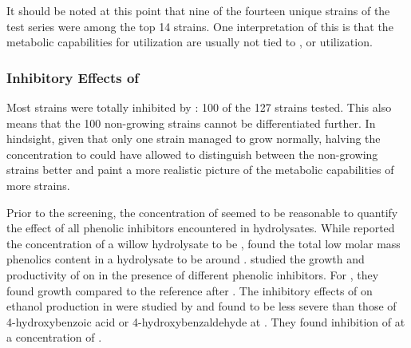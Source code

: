 
It should be noted at this point that nine of the fourteen unique strains of the \laev{} test series were among the \laev{} top 14 strains. One interpretation of this is that the metabolic capabilities for \laev{} utilization are usually not tied to \acet{}, \van{} or \hmf{} utilization.


\subsubsection{Inhibitory Effects of \VAN{}}
Most strains were totally inhibited by \van{}: 100 of the 127 strains tested. This also means that the 100 non-growing strains cannot be differentiated further. In hindsight, given that only one strain managed to grow normally, halving the \van{} concentration to  could have allowed to distinguish between the non-growing strains better and paint a more realistic picture of the metabolic capabilities of more strains.

Prior to the screening, the \van{} concentration of  seemed to be reasonable to quantify the effect of all phenolic inhibitors encountered in hydrolysates. While \textcite{Jonsson1998} reported the \van{} concentration of a willow hydrolysate to be , \textcite{Clark1984} found the total low molar mass phenolics content in a  hydrolysate to be around . \textcite{Nishikawa1988} studied the growth and productivity of  on \xyl{} in the presence of different phenolic inhibitors. For \van{}, they found  growth compared to the reference after . The inhibitory effects of \van{} on ethanol production in  were studied by \textcite{Ando1986} and found to be less severe than those of 4-hydroxybenzoic acid or 4-hydroxybenzaldehyde at . They found  inhibition of  at a \van{} concentration of .


